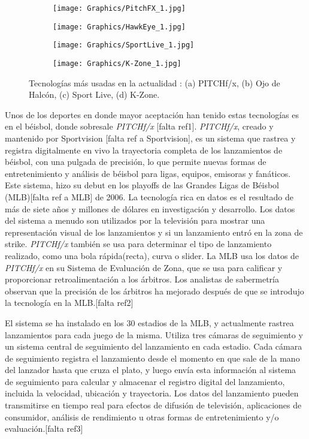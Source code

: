 \begin{figure}[!h]
	\centering
	\begin{subfigure}[b]{0.49\linewidth}
		\texttt{[image: Graphics/PitchFX\_1.jpg]}
		\caption{}
	\end{subfigure}
	\begin{subfigure}[b]{0.49\linewidth}
		\texttt{[image: Graphics/HawkEye\_1.jpg]}
		\caption{}
	\end{subfigure}
    \begin{subfigure}[b]{0.49\linewidth}
        \texttt{[image: Graphics/SportLive\_1.jpg]}
        \caption{}
    \end{subfigure}
    \begin{subfigure}[b]{0.49\linewidth}
        \texttt{[image: Graphics/K-Zone\_1.jpg]}
        \caption{}
    \end{subfigure}
    \caption{Tecnologías más usadas en la actualidad : (a) PITCHf/x, (b) Ojo de Halcón,
            (c) Sport Live, (d) K-Zone.}
	\label{fig:technologys}
\end{figure}

Unos de los deportes en donde mayor aceptación han tenido estas tecnologías es en el béisbol, donde sobresale \textit{PITCHf/x} [falta ref1]. \textit{PITCHf/x}, creado y mantenido por Sportvision [falta ref a Sportvision], es un sistema que rastrea y registra digitalmente en vivo la trayectoria completa de los lanzamientos de béisbol, con una pulgada de precisión, lo que permite nuevas formas de entretenimiento y análisis de béisbol para ligas, equipos, emisoras y fanáticos. Este sistema, hizo su debut en los playoffs de las Grandes Ligas de Béisbol (MLB)[falta ref a MLB] de 2006. La tecnología rica en datos es el resultado de más de siete años y millones de dólares en investigación y desarrollo. Los datos del sistema a menudo son utilizados por la televisión para mostrar una representación visual de los lanzamientos y si un lanzamiento entró en la zona de strike. \textit{PITCHf/x} también se usa para determinar el tipo de lanzamiento realizado, como una bola rápida(recta), curva o slider. La MLB usa los datos de \textit{PITCHf/x} en su Sistema de Evaluación de Zona, que se usa para calificar y proporcionar retroalimentación a los árbitros. Los analistas de sabermetría observan que la precisión de los árbitros ha mejorado después de que se introdujo la tecnología en la MLB.[falta ref2]

El sistema se ha instalado en los 30 estadios de la MLB, y actualmente rastrea lanzamientos para cada juego de la misma. Utiliza tres cámaras de seguimiento y un sistema central de seguimiento del lanzamiento en cada estadio. Cada cámara de seguimiento registra el lanzamiento desde el momento en que sale de la mano del lanzador hasta que cruza el plato, y luego envía esta información al sistema de seguimiento para calcular y almacenar el registro digital del lanzamiento, incluida la velocidad, ubicación y trayectoria. Los datos del lanzamiento pueden transmitirse en tiempo real para efectos de difusión de televisión, aplicaciones de consumidor, análisis de rendimiento u otras formas de entretenimiento y/o evaluación.[falta ref3]

